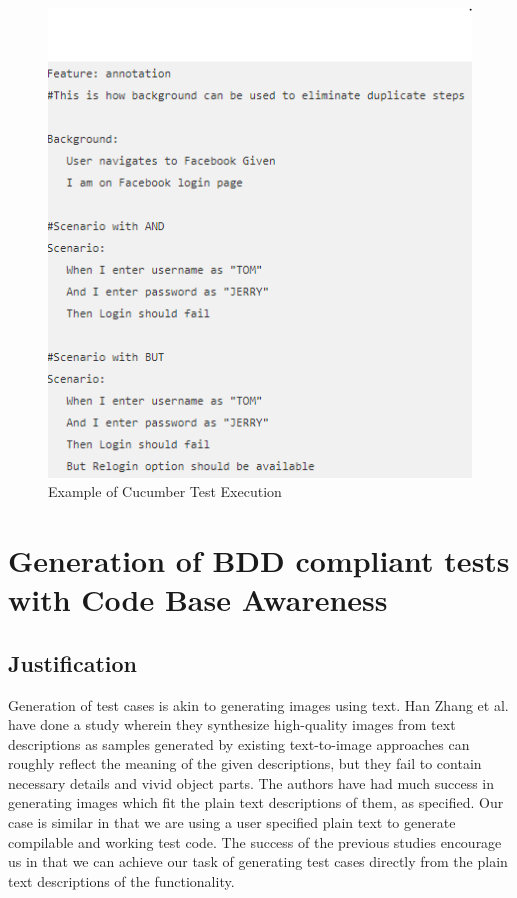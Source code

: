\documentclass[conference]{IEEEtran}
\begin{document}
\begin{figure}
	\includegraphics[width=\linewidth]{cucumber_figure.png}
	\caption{Example of Cucumber Test Execution}
	\label{fig1}
\end{figure}

\section{Generation of BDD compliant tests with Code Base Awareness}
\subsection{Justification}
Generation of test cases is akin to generating images using text. Han Zhang et al. have done a study wherein they synthesize high-quality images from text descriptions as samples generated by existing text-to-image approaches can roughly reflect the meaning of the given descriptions, but they fail to contain necessary details
and vivid object parts. The authors have had much success in generating images which fit the plain text descriptions of them, as specified.\cite{b5} Our case is similar in that we are using a user specified plain text to generate compilable and working test code. The success of the previous studies encourage us in that we can achieve our task of generating test cases directly from the plain text descriptions of the functionality.
\end{document}
